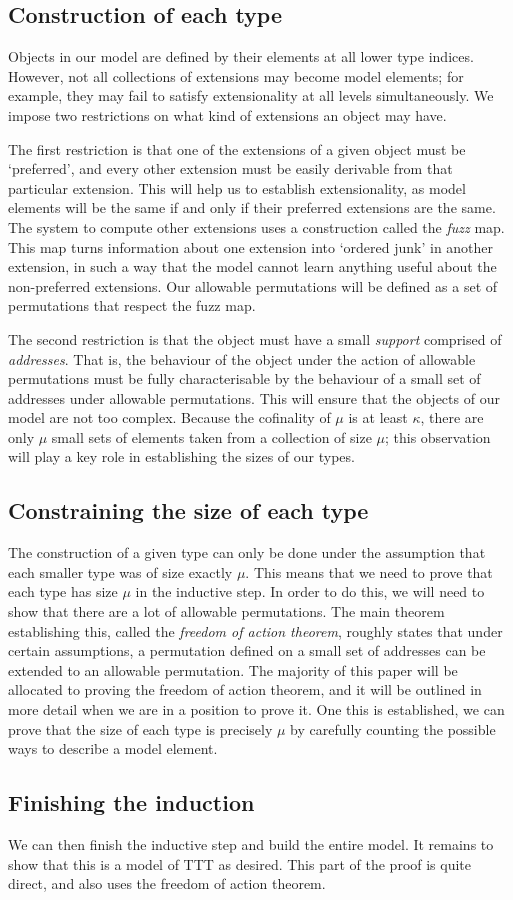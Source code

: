 \subsection{Construction of each type}
\label{ss:outline:construction}

Objects in our model are defined by their elements at all lower type indices.
However, not all collections of extensions may become model elements; for example, they may fail to satisfy extensionality at all levels simultaneously.
We impose two restrictions on what kind of extensions an object may have.

The first restriction is that one of the extensions of a given object must be `preferred', and every other extension must be easily derivable from that particular extension.
This will help us to establish extensionality, as model elements will be the same if and only if their preferred extensions are the same.
The system to compute other extensions uses a construction called the \emph{fuzz} map.
This map turns information about one extension into `ordered junk' in another extension, in such a way that the model cannot learn anything useful about the non-preferred extensions.
Our allowable permutations will be defined as a set of permutations that respect the fuzz map.

The second restriction is that the object must have a small \emph{support} comprised of \emph{addresses}.
That is, the behaviour of the object under the action of allowable permutations must be fully characterisable by the behaviour of a small set of addresses under allowable permutations.
This will ensure that the objects of our model are not too complex.
Because the cofinality of \( \mu \) is at least \( \kappa \), there are only \( \mu \) small sets of elements taken from a collection of size \( \mu \); this observation will play a key role in establishing the sizes of our types.

\subsection{Constraining the size of each type}
\label{ss:outline:size}

The construction of a given type can only be done under the assumption that each smaller type was of size exactly \( \mu \).
This means that we need to prove that each type has size \( \mu \) in the inductive step.
In order to do this, we will need to show that there are a lot of allowable permutations.
The main theorem establishing this, called the \emph{freedom of action theorem}, roughly states that under certain assumptions, a permutation defined on a small set of addresses can be extended to an allowable permutation.
The majority of this paper will be allocated to proving the freedom of action theorem, and it will be outlined in more detail when we are in a position to prove it.
One this is established, we can prove that the size of each type is precisely \( \mu \) by carefully counting the possible ways to describe a model element.

\subsection{Finishing the induction}
\label{ss:outline:finishing}

We can then finish the inductive step and build the entire model.
It remains to show that this is a model of TTT as desired.
This part of the proof is quite direct, and also uses the freedom of action theorem.
